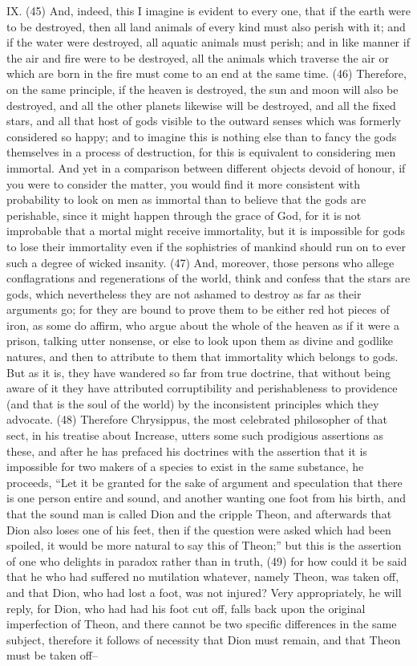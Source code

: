 IX. (45) And, indeed, this I imagine is evident to every one, that if the earth were to be destroyed,
then all land animals of every kind must also perish with it; and if the water were destroyed, all
aquatic animals must perish; and in like manner if the air and fire were to be destroyed, all the
animals which traverse the air or which are born in the fire must come to an end at the same time.
(46) Therefore, on the same principle, if the heaven is destroyed, the sun and moon will also be
destroyed, and all the other planets likewise will be destroyed, and all the fixed stars, and all that
host of gods visible to the outward senses which was formerly considered so happy; and to
imagine this is nothing else than to fancy the gods themselves in a process of destruction, for this
is equivalent to considering men immortal. And yet in a comparison between different objects
devoid of honour, if you were to consider the matter, you would find it more consistent with
probability to look on men as immortal than to believe that the gods are perishable, since it might
happen through the grace of God, for it is not improbable that a mortal might receive immortality,
but it is impossible for gods to lose their immortality even if the sophistries of mankind should run
on to ever such a degree of wicked insanity. (47) And, moreover, those persons who allege
conflagrations and regenerations of the world, think and confess that the stars are gods, which
nevertheless they are not ashamed to destroy as far as their arguments go; for they are bound to
prove them to be either red hot pieces of iron, as some do affirm, who argue about the whole of
the heaven as if it were a prison, talking utter nonsense, or else to look upon them as divine and
godlike natures, and then to attribute to them that immortality which belongs to gods. But as it is,
they have wandered so far from true doctrine, that without being aware of it they have attributed
corruptibility and perishableness to providence (and that is the soul of the world) by the
inconsistent principles which they advocate. (48) Therefore Chrysippus, the most celebrated
philosopher of that sect, in his treatise about Increase, utters some such prodigious assertions as
these, and after he has prefaced his doctrines with the assertion that it is impossible for two
makers of a species to exist in the same substance, he proceeds, ``Let it be granted for the sake
of argument and speculation that there is one person entire and sound, and another wanting one
foot from his birth, and that the sound man is called Dion and the cripple Theon, and afterwards
that Dion also loses one of his feet, then if the question were asked which had been spoiled, it
would be more natural to say this of Theon;'' but this is the assertion of one who delights in paradox
rather than in truth, (49) for how could it be said that he who had suffered no mutilation whatever,
namely Theon, was taken off, and that Dion, who had lost a foot, was not injured? Very
appropriately, he will reply, for Dion, who had had his foot cut off, falls back upon the original
imperfection of Theon, and there cannot be two specific differences in the same subject, therefore
it follows of necessity that Dion must remain, and that Theon must be taken off--

